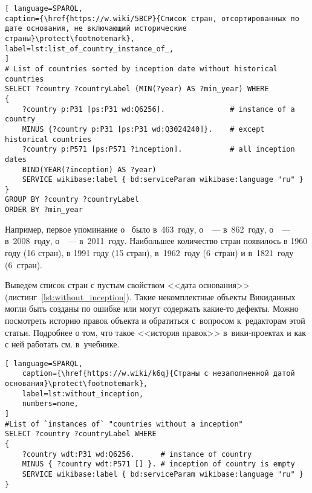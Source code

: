 \begin{lstlisting}[ language=SPARQL, 
caption={\href{https://w.wiki/5BCP}{Список стран, отсортированных по дате основания, не включающий исторические страны}\protect\footnotemark},
label=lst:list_of_country_instance_of_, 
]
# List of countries sorted by inception date without historical countries
SELECT ?country ?countryLabel (MIN(?year) AS ?min_year) WHERE
{
	?country p:P31 [ps:P31 wd:Q6256].               # instance of a country 
	MINUS {?country p:P31 [ps:P31 wd:Q3024240]}.    # except historical countries
	?country p:P571 [ps:P571 ?inception].           # all inception dates
	BIND(YEAR(?inception) AS ?year)
	SERVICE wikibase:label { bd:serviceParam wikibase:language "ru" }
}
GROUP BY ?country ?countryLabel
ORDER BY ?min_year
\end{lstlisting}


Например, первое упоминание о~ было в~463~году, о~~--- в~862~году, о~~--- в~2008~году, о~~--- в~2011~году. 
Наибольшее количество стран появилось в 1960 году (16 стран), 
в 1991 году (15 стран), в~1962~году (6~стран) и в~1821~году (6~стран).


\newpage
Выведем список стран с пустым свойством <<дата основания>> (листинг~\ref{lst:without_inception}). 
Такие некомплектные объекты Викиданных могли быть созданы по ошибке или могут содержать какие-то дефекты. 
Можно посмотреть историю правок объекта и обратиться с~вопросом к~редакторам этой статьи. 
Подробнее о том, что такое <<история правок>> в~вики-проектах 
и как с ней работать см. в~учебнике\autocite{Krizhanovsky2015}.

\begin{lstlisting}[ language=SPARQL, 
    caption={\href{https://w.wiki/k6q}{Страны с незаполненной датой основания}\protect\footnotemark},
    label=lst:without_inception,
    numbers=none,
]
#List of `instances of` "countries without a inception" 
SELECT ?country ?countryLabel WHERE
{
    ?country wdt:P31 wd:Q6256.      # instance of country
    MINUS { ?country wdt:P571 [] }. # inception of country is empty
    SERVICE wikibase:label { bd:serviceParam wikibase:language "ru" }
}
\end{lstlisting}




